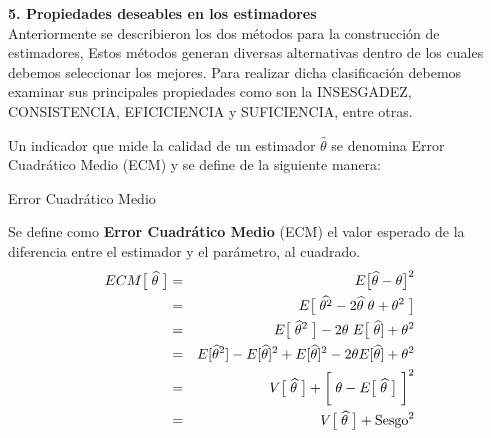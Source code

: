 \documentclass[base=hide,11pt]{elegantbook}
\begin{document}
{\vspace{1cm}

\textcolor{col4}{\bf \LARGE  5. Propiedades deseables en los estimadores}\\

			
Anteriormente se describieron los dos métodos para la construcción de estimadores, Estos métodos generan diversas alternativas dentro de los cuales debemos seleccionar los mejores. Para realizar dicha clasificación debemos examinar sus principales propiedades como son la INSESGADEZ, CONSISTENCIA, EFICICIENCIA y SUFICIENCIA, entre otras.
			
Un indicador que mide la calidad de un estimador $\widehat{\theta}$ se denomina Error Cuadrático Medio (ECM) y se define de la siguiente manera:\\
			
\begin{Box2}{Error Cuadrático Medio}  
	
Se define como {\bf Error Cuadrático Medio} (ECM) el valor esperado de la diferencia entre el estimador y el parámetro, al cuadrado.
\begin{eqnarray*}
ECM\big[ \hspace{.1cm}\widehat{\theta} \hspace{.1cm}\big]&=&E\big[\widehat{\theta}-\theta\big]^{2}\\
&=& E\big[\hspace{.1cm}\widehat{\theta ^{2}}-2\widehat{\theta}\hspace{.1cm}\theta + \theta^{2} \hspace{.1cm}\big]\\
&=& E\big[\hspace{.1cm}\widehat{\theta}^{2}\hspace{.1cm} \big] - 2 \theta \hspace{.1cm}E\big[\hspace{.1cm}\widehat{\theta}] + \theta^{2} \\
&=& E[\widehat{\theta}^{2}]-E[\widehat{\theta}]^{2}+E[\widehat{\theta}]^{2}-2 \theta E[\widehat{\theta}]+\theta^{2} \\
&=&V\big[\hspace{.1cm}\widehat{\theta}\hspace{.1cm}\big]+ \bigg[\hspace{.1cm}\theta - E\big[\hspace{.1cm}\widehat{\theta}\hspace{.1cm}\big]\hspace{.1cm}\bigg]^{2}\\ &=&V\big[\hspace{.1cm}\widehat{\theta}\hspace{.1cm}\big]+ \text{Sesgo}^{2}\\     
\end{eqnarray*}
\end{Box2}				

}
\end{document}
